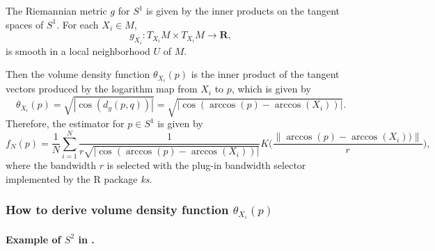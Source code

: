 \documentclass[11pt,a4paper,]{article}
\begin{document}
The Riemannian metric \(g\) for \(S^1\) is given by the inner products on the tangent spaces of \(S^1\). For each \(X_i \in M\),
\[
g_{X_i}: T_{X_i}M \times T_{X_i}M \rightarrow \pmb{R},
\]
is smooth in a local neighborhood \(U\) of \(M\).

Then the volume density function \(\theta_{X_i}(p)\) is the inner product of the tangent vectors produced by the logarithm map from \(X_i\) to \(p\), which is given by
\[
\theta_{X_i}(p) = \sqrt{|\cos(d_g(p,q))|} = \sqrt{|\cos(\arccos(p) - \arccos(X_i))|}.
\]
Therefore, the estimator for \(p \in S^1\) is given by
\[
f_N(p) = \frac{1}{N} \sum_{i=1}^{N} \frac{1}{r \sqrt{|\cos(\arccos(p) - \arccos(X_i))|}} K\bigg(\frac{\|\arccos(p) - \arccos(X_i))\|}{r}\bigg),
\]
where the bandwidth \(r\) is selected with the plug-in bandwidth selector implemented by the R package \emph{ks}.

\hypertarget{how-to-derive-volume-density-function-theta_x_ip}{%
\subsubsection{\texorpdfstring{How to derive volume density function \(\theta_{X_i}(p)\)}{How to derive volume density function \textbackslash theta\_\{X\_i\}(p)}}\label{how-to-derive-volume-density-function-theta_x_ip}}

\hypertarget{example-of-s2-in-henry2009-om.}{%
\paragraph{\texorpdfstring{Example of \(S^2\) in \textcite{Henry2009-om}.}{Example of S\^{}2 in @Henry2009-om.}}\label{example-of-s2-in-henry2009-om.}}
\end{document}
